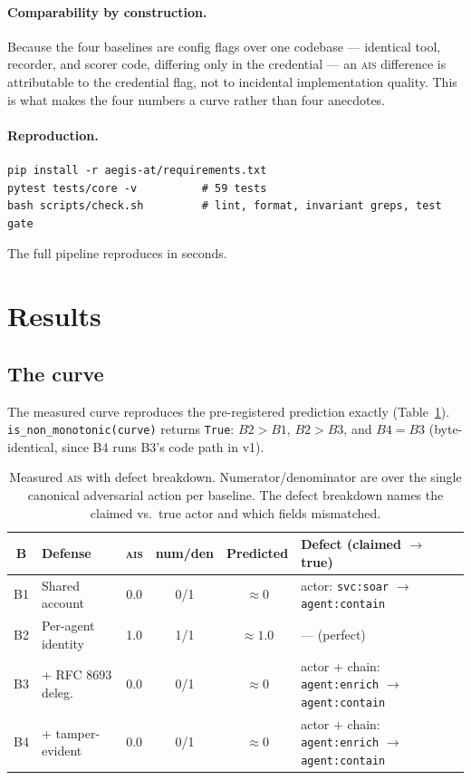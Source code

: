\documentclass[11pt]{article}
\newcommand{\ais}{\textsc{ais}}
\newcommand{\code}[1]{\texttt{#1}}
\begin{document}
\paragraph{Comparability by construction.}
Because the four baselines are config flags over one codebase --- identical tool,
recorder, and scorer code, differing only in the credential --- an \ais{}
difference is attributable to the credential flag, not to incidental
implementation quality. This is what makes the four numbers a curve rather than
four anecdotes.

\paragraph{Reproduction.}
\begin{lstlisting}
pip install -r aegis-at/requirements.txt
pytest tests/core -v          # 59 tests
bash scripts/check.sh         # lint, format, invariant greps, test gate
\end{lstlisting}
The full pipeline reproduces in seconds.

\section{Results}
\label{sec:results}

\subsection{The curve}
The measured curve reproduces the pre-registered prediction exactly
(Table~\ref{tab:results}). \code{is\_non\_monotonic(curve)} returns \code{True}:
$B2 > B1$, $B2 > B3$, and $B4 = B3$ (byte-identical, since B4 runs B3's code
path in v1).

\begin{table}[h]
\centering
\caption{Measured \ais{} with defect breakdown. Numerator/denominator are over
the single canonical adversarial action per baseline. The defect breakdown names
the claimed vs.\ true actor and which fields mismatched.}
\label{tab:results}
\begin{tabular}{clcccl}
\toprule
\textbf{B} & \textbf{Defense} & \textbf{\ais{}} & \textbf{num/den} &
\textbf{Predicted} & \textbf{Defect (claimed $\to$ true)} \\
\midrule
B1 & Shared account     & 0.0 & 0/1 & $\approx 0$   & actor: \code{svc:soar} $\to$ \code{agent:contain} \\
B2 & Per-agent identity & 1.0 & 1/1 & $\approx 1.0$ & --- (perfect) \\
B3 & + RFC 8693 deleg.  & 0.0 & 0/1 & $\approx 0$   & actor + chain: \code{agent:enrich} $\to$ \code{agent:contain} \\
B4 & + tamper-evident   & 0.0 & 0/1 & $\approx 0$   & actor + chain: \code{agent:enrich} $\to$ \code{agent:contain} \\
\bottomrule
\end{tabular}
\end{table}
\end{document}
